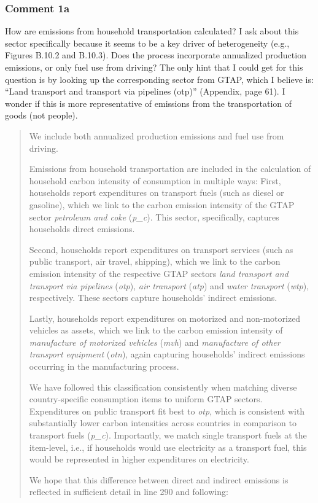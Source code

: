 \documentclass[11pt]{article}
\newenvironment{response}
{\begin{quote}\color{black}}
{\end{quote}}
\begin{document}
\subsubsection*{Comment 1a}\label{comment_R2_1a}

\begin{commentbox}
    How are emissions from household transportation calculated? I ask about this sector specifically because it seems to be a key driver of heterogeneity (e.g., Figures B.10.2 and B.10.3). Does the process incorporate annualized production emissions, or only fuel use from driving? The only hint that I could get for this question is by looking up the corresponding sector from GTAP, which I believe is: “Land transport and transport via pipelines (otp)” (Appendix, page 61). I wonder if this is more representative of emissions from the transportation of goods (not people).
\end{commentbox}

\begin{response}
    We include both annualized production emissions and fuel use from driving.

    Emissions from household transportation are included in the calculation of household carbon intensity of consumption in multiple ways: First, households report expenditures on transport fuels (such as diesel or gasoline), which we link to the carbon emission intensity of the GTAP sector \textit{petroleum and coke} (\textit{p\_c}). This sector, specifically, captures households direct emissions. 
    
    Second, households report expenditures on transport services (such as public transport, air travel, shipping), which we link to the carbon emission intensity of the respective GTAP sectors \textit{land transport and transport via pipelines} (\textit{otp}), \textit{air transport} (\textit{atp}) and \textit{water transport} (\textit{wtp}), respectively. These sectors capture households' indirect emissions. 
    
    Lastly, households report expenditures on motorized and non-motorized vehicles as assets, which we link to the carbon emission intensity of \textit{manufacture of motorized vehicles} (\textit{mvh}) and \textit{manufacture of other transport equipment} (\textit{otn}), again capturing households' indirect emissions occurring in the manufacturing process.

    We have followed this classification consistently when matching diverse country-specific consumption items to uniform GTAP sectors. Expenditures on public transport fit best to \textit{otp}, which is consistent with substantially lower carbon intensities across countries in comparison to transport fuels (\textit{p\_c}). Importantly, we match single transport fuels at the item-level, i.e., if households would use electricity as a transport fuel, this would be represented in higher expenditures on electricity.

    We hope that this difference between direct and indirect emissions is reflected in sufficient detail in line 290 and following:
    
\end{response}
\end{document}
